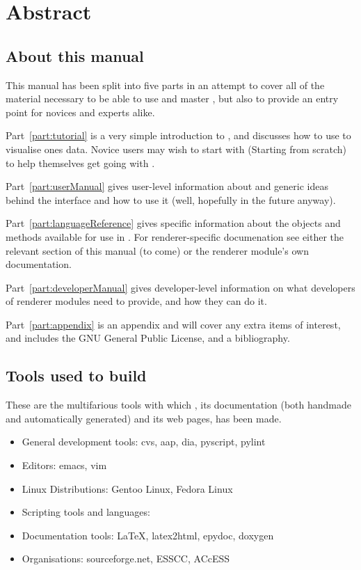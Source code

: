 
\chapter*{Abstract}

\section*{About this manual}

This manual has been split into five parts in an attempt to cover all of the
material necessary to be able to use and master \pyvisi, but also to provide an
entry point for novices and experts alike.

Part~\ref{part:tutorial} is a very simple introduction to \pyvisi, and
discusses how to use \pyvisi to visualise ones data.  Novice users may wish to
start with  (Starting from scratch) to help
themselves get going with \pyvisi.  

Part~\ref{part:userManual} gives user-level information about \pyvisi and
generic ideas behind the interface and how to use it (well, hopefully in the
future anyway).

Part~\ref{part:languageReference} gives specific information about the objects
and methods available for use in \pyvisi.  For renderer-specific documenation
see either the relevant section of this manual (to come) or the renderer
module's own documentation.

Part~\ref{part:developerManual} gives developer-level information on what
developers of renderer modules need to provide, and how they can do it.

Part~\ref{part:appendix} is an appendix and will cover any extra items of
interest, and includes the GNU General Public License, and a bibliography.

\section*{Tools used to build \pyvisi}

These are the multifarious tools with which \pyvisi, its documentation (both
handmade and automatically generated) and its web pages, has been made.

\begin{itemize}
\item General development tools: cvs, aap, dia, pyscript, pylint
\item Editors: emacs, vim
\item Linux Distributions: Gentoo Linux, Fedora Linux
\item Scripting tools and languages: ~\cite{web:python}
\item Documentation tools: \LaTeX, latex2html, epydoc, doxygen
\item Organisations: sourceforge.net, ESSCC, ACcESS
\end{itemize}

